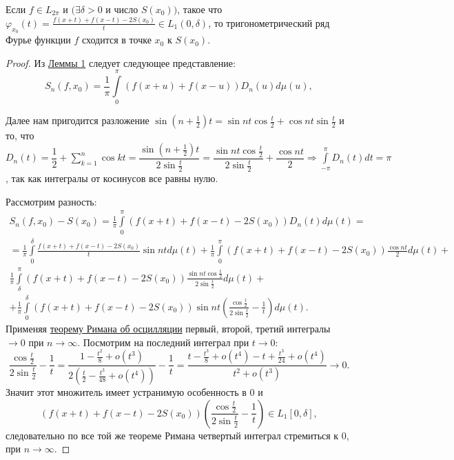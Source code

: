 \begin{theorem}
	Если $f\in L_{2\pi}$ и $(\exists\delta>0$ и число $S(x_0))$, такое что $\varphi_{x_0}(t)=\frac{f(x+t)+f(x-t)-2S(x_0)}{t}\in L_1(0,\delta)$, то тригонометрический ряд Фурье функции $f$ сходится в точке $x_0$ к $S(x_0)$.
\end{theorem} 
\begin{proof}
	Из \hyperref[lemma_12.2.1]{Леммы 1} следует следующее представление: $$S_n(f,x_0)=\frac{1}{\pi}\int\limits_{0}^\pi(f(x+u)+f(x-u))D_n(u)d\mu(u),$$
	
	Далее нам пригодится разложение $\sin(n+\frac{1}{2})t=\sin nt\cos \frac{t}{2}+\cos nt\sin\frac{t}{2}$ и то, что\\ $D_n(t)=\dfrac{1}{2}+\sum\limits_{k=1}^n\cos kt=\dfrac{\sin(n+\frac{1}{2})t}{2\sin\frac{t}{2}}=\dfrac{\sin nt\cos \frac{t}{2}}{2\sin\frac{t}{2}}+\dfrac{\cos nt}{2}\Rightarrow \int\limits_{-\pi}^\pi D_n(t)dt=\pi$, так как интегралы от косинусов все равны нулю.
	
	Рассмотрим разность:
	\begin{multline*}
		S_n(f,x_0)-S(x_0)=\frac{1}{\pi}\int\limits_{0}^\pi(f(x+t)+f(x-t)-2S(x_0))D_n(t)d\mu(t)=\\=\frac{1}{\pi}\int\limits_{0}^\delta\frac{f(x+t)+f(x-t)-2S(x_0)}{t}\sin ntd\mu(t)+\frac{1}{\pi}\int\limits_{0}^\pi (f(x+t)+f(x-t)-2S(x_0))\frac{\cos nt}{2}d\mu(t)+ \\ \frac{1}{\pi}\int\limits_{\delta}^\pi (f(x+t)+f(x-t)-2S(x_0))\frac{\sin nt\cos\frac{t}{2}}{2\sin\frac{t}{2}}d\mu(t)+\\+\frac{1}{\pi}\int\limits_{0}^\delta (f(x+t)+f(x-t)-2S(x_0))\sin nt \left(\frac{\cos \frac{t}{2}}{2\sin\frac{t}{2}}-\frac{1}{t}\right)d\mu(t).
	\end{multline*}
Применяя \hyperref[theorem_12.1.1]{теорему Римана об осцилляции} первый, второй, третий интегралы $\to 0$ при $n\to\infty$. Посмотрим на последний интеграл при $t\to 0$:
$$\frac{\cos \frac{t}{2}}{2\sin\frac{t}{2}}-\frac{1}{t}=\frac{1-\frac{t^2}{8}+o(t^3)}{2(\frac{t}{2}-\frac{t^3}{48}+o(t^4))}-\frac{1}{t}=\frac{t-\frac{t^3}{8}+o(t^4)-t+\frac{t^3}{24}+o(t^4)}{t^2+o(t^3)}\to 0.$$
 Значит этот множитель имеет устранимую особенность в 0 и $$(f(x+t)+f(x-t)-2S(x_0))\left(\frac{\cos \frac{t}{2}}{2\sin\frac{t}{2}}-\frac{1}{t}\right)\in L_1[0,\delta], $$ следовательно по все той же теореме Римана четвертый интеграл стремиться к 0, при $n\to\infty$.
\end{proof}














